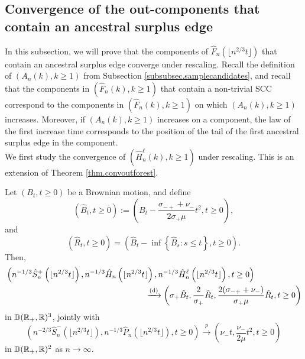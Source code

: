 \subsection{Convergence of the out-components that contain an ancestral surplus edge}\label{subsec.ancestral}
In this subsection, we will prove that the components of $\hat{F}_n\left(\lfloor n^{2/3}t\rfloor\right)$ that contain an ancestral surplus edge converge under rescaling. Recall the definition of $(A_n(k),k\geq 1)$ from Subsection \ref{subsubsec.samplecandidates}, and recall that the components in $(\hat{F}_n(k),k\geq 1)$ that contain a non-trivial SCC correspond to the components in $(\hat{F}_n(k),k\geq 1)$ on which $(A_n(k),k\geq 1)$ increases. Moreover, if $(A_n(k),k\geq 1)$ increases on a component, the law of the first increase time corresponds to the position of the tail of the first ancestral surplus edge in the component. \\
We first study the convergence of $(\hat{H}_n^\ell(k),k\geq 1)$ under rescaling. This is an extension of Theorem \ref{thm.convoutforest}.
\begin{lemma}\label{lemma.heightprocesswithlengths}
Let $(B_t, t\geq 0)$ be a Brownian motion, and define
$$(\hat{B}_t,t\geq 0):=\left( B_t-\frac{\sigma_{-+}+\nu_-}{2\sigma_+ \mu}t^2, t\geq 0\right),$$ and $$(\hat{R}_t,t\geq 0)=\left(\hat{B}_t-\inf\left\{\hat{B}_s: s\leq t\right\},t\geq 0\right).$$ 
Then,
\begin{align*}
    &\left(n^{-1/3}\hat{S}^{+}_n\left(\lfloor n^{2/3}t\rfloor \right),n^{-1/3}\hat{H}_{n}\left(\lfloor n^{2/3}t\rfloor \right),n^{-1/3}\hat{H}^\ell_{n}\left(\lfloor n^{2/3}t\rfloor \right),  t\geq 0\right)\\
    &\hspace{17em} \todist\left(\sigma_+ \hat{B}_t, \frac{2}{\sigma_+} \hat{R}_t,\frac{2(\sigma_{-+}+\nu_-)}{\sigma_+\mu} \hat{R}_t, t\geq 0\right)
\end{align*}
in ${\mathbb D}({\mathbb R}_+,{\mathbb R})^3$,
jointly with 
$$\left(n^{-2/3}\hat{S}_n^-\left(\lfloor n^{2/3}t\rfloor \right), n^{-1/3}\hat{P}_n\left(\lfloor n^{2/3}t\rfloor \right),t\geq 0\right)\overset{p}{\to}\left(\nu_-t,  \frac{\nu_-}{2\mu} t^2, t\geq 0\right)$$
in ${\mathbb D}({\mathbb R}_+,{\mathbb R})^2$ as $n\to \infty$.
\end{lemma}
